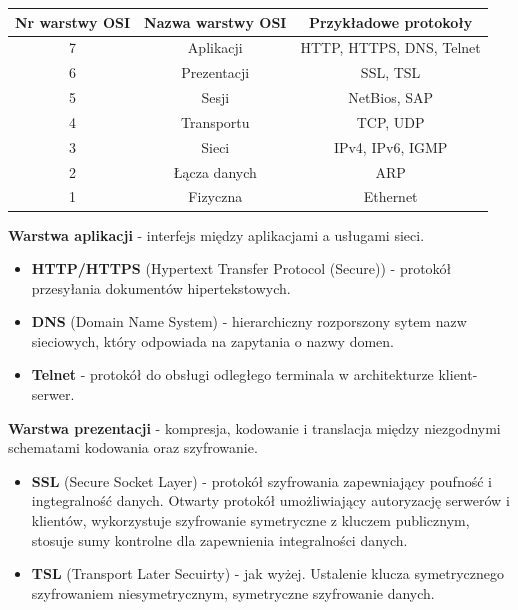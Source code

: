 \documentclass[12pt]{article}
\begin{document}
    \begin{table}[H]
        \begin{center}
            \begin{tabular}{|c|c|c| }
                \hline
                \textbf{Nr warstwy OSI} & \textbf{Nazwa warstwy OSI} & \textbf{Przykładowe protokoły}\\
                \hline
                \hline
                7 & Aplikacji & HTTP, HTTPS, DNS, Telnet\\
                \hline
                6 & Prezentacji & SSL, TSL\\
                \hline
                5 & Sesji & NetBios, SAP\\
                \hline
                4 & Transportu & TCP, UDP\\
                \hline
                3 & Sieci & IPv4, IPv6, IGMP\\
                \hline
                2 & Łącza danych & ARP\\
                \hline
                1 & Fizyczna & Ethernet\\
                \hline
            \end{tabular}
        \end{center}
    \end{table}

    \noindent \textbf{Warstwa aplikacji} - interfejs między aplikacjami a
    usługami sieci.
    \begin{itemize}
        \item \textbf{HTTP/HTTPS} (Hypertext Transfer Protocol (Secure)) - protokół przesyłania dokumentów hipertekstowych.
        \item \textbf{DNS} (Domain Name System) - hierarchiczny rozporszony sytem nazw sieciowych, który odpowiada na zapytania
        o nazwy domen.
        \item \textbf{Telnet} - protokół do obsługi odległego terminala w architekturze klient-serwer.
    \end{itemize}

    \noindent \textbf{Warstwa prezentacji} - kompresja, kodowanie i
    translacja między niezgodnymi schematami kodowania oraz szyfrowanie.
    \begin{itemize}
        \item \textbf{SSL} (Secure Socket Layer) - protokół szyfrowania zapewniający poufność i ingtegralność danych.
        Otwarty protokół umożliwiający autoryzację serwerów i klientów, wykorzystuje szyfrowanie symetryczne
        z kluczem publicznym, stosuje sumy kontrolne dla zapewnienia integralności danych.
        \item \textbf{TSL} (Transport Later Secuirty) - jak wyżej. Ustalenie klucza symetrycznego szyfrowaniem niesymetrycznym,
        symetryczne szyfrowanie danych.
    \end{itemize}
\end{document}

